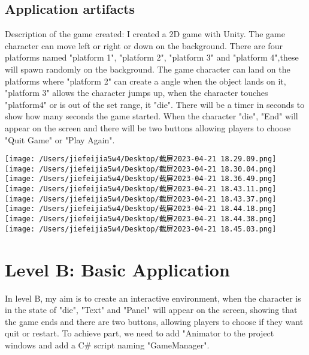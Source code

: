 \documentclass[a4paper, 11pt]{report}
\begin{document}
\subsection{Application artifacts}
Description of the game created:
I created a 2D game with Unity.  The game character can move left or right or down on the background. There are four platforms named "platform 1",  "platform 2",  "platform 3" and "platform 4",these will spawn randomly on the background. The game character can land on the platforms where "platform 2" can create a angle when the object lands on it,  "platform 3" allows the character jumps up, when the character touches "platform4" or is out of the set range,  it "die". There will be a timer in seconds to show how many seconds the game started.  When the character "die", "End" will appear on the screen and there will be two buttons allowing players to choose "Quit Game" or "Play Again".

\texttt{[image: /Users/jiefeijia5w4/Desktop/截屏2023-04-21 18.29.09.png]}
\texttt{[image: /Users/jiefeijia5w4/Desktop/截屏2023-04-21 18.30.04.png]}
\texttt{[image: /Users/jiefeijia5w4/Desktop/截屏2023-04-21 18.36.49.png]}
\texttt{[image: /Users/jiefeijia5w4/Desktop/截屏2023-04-21 18.43.11.png]}
\texttt{[image: /Users/jiefeijia5w4/Desktop/截屏2023-04-21 18.43.37.png]}
\texttt{[image: /Users/jiefeijia5w4/Desktop/截屏2023-04-21 18.44.18.png]}
\texttt{[image: /Users/jiefeijia5w4/Desktop/截屏2023-04-21 18.44.38.png]}
\texttt{[image: /Users/jiefeijia5w4/Desktop/截屏2023-04-21 18.45.03.png]}















\newpage
\section{Level B: Basic Application}
In level B,  my aim is to create an interactive environment,  when the character is in the state of "die",  "Text" and "Panel" will appear on the screen,  showing that the game ends and there are two buttons, allowing players to choose if they want quit or restart. To achieve part, we need to add "Animator to the project windows and add a C\# script naming "GameManager".
\end{document}
